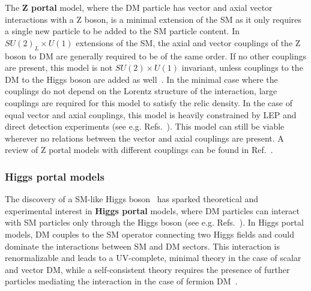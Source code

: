 The \textbf{Z portal} model, where the DM particle has vector and axial vector interactions with a Z boson, is a minimal extension of the SM as it only requires a single new particle to be added to the SM particle content. In $SU(2)_L \times U(1)$ extensions of the SM, the axial and vector couplings of the Z boson to DM are generally required to be of the same order. If no other couplings are present, this model is not $SU(2) \times U(1)$ invariant, unless couplings to the DM to the Higgs boson are added as well~\cite{Kahlhoefer:2015bea}. 
In the minimal case where the couplings do not depend on the Lorentz structure of the interaction, 
large couplings are required for this model to satisfy the relic density. 
In the case of equal vector and axial couplings, this model is heavily constrained by LEP and direct detection experiments (see e.g. Refs.~\cite{Arcadi:2014lta,Escudero:2016gzx}). This model can still be viable wherever no relations between the vector and axial couplings are present. A review of Z portal models with different couplings can be found in Ref.~\cite{Arcadi:2014lta}. 

\subsubsection{Higgs portal models}

The discovery of a SM-like Higgs boson~\cite{Aad:2012tfa,Chatrchyan:2012xdj} has sparked theoretical and experimental interest in \textbf{Higgs portal} models, where DM particles can interact with SM particles only through the Higgs boson (see e.g. Refs.~\cite{Patt:2006fw,Englert:2011yb,Djouadi:2011aa}). In Higgs portal models, DM couples to the SM operator connecting two Higgs fields and could dominate the interactions between SM and DM sectors.
This interaction is renormalizable and leads to a UV-complete, minimal theory in the case of scalar and vector DM, while a self-consistent theory requires the presence of further particles mediating the interaction in the case of fermion DM~\cite{Freitas:2015hsa}. 

